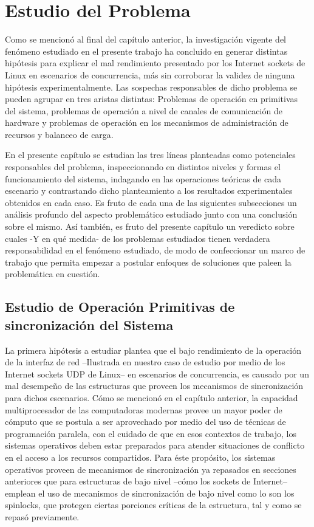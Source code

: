 \chapter{Estudio del Problema}

Como se mencionó al final del capítulo anterior, la investigación vigente del fenómeno estudiado en el presente trabajo ha concluido en generar distintas hipótesis para explicar el mal rendimiento presentado por los Internet sockets de Linux en escenarios de concurrencia, más sin corroborar la validez de ninguna hipótesis experimentalmente. Las sospechas responsables de dicho problema se pueden agrupar en tres aristas distintas: Problemas de operación en primitivas del sistema, problemas de operación a nivel de canales de comunicación de hardware y problemas de operación en los mecanismos de administración de recursos y balanceo de carga.

En el presente capítulo se estudian las tres líneas planteadas como potenciales responsables del problema, inspeccionando en distintos niveles y formas el funcionamiento del sistema, indagando en las operaciones teóricas de cada escenario y contrastando dicho planteamiento a los resultados experimentales obtenidos en cada caso. Es fruto de cada una de las siguientes subsecciones un análisis profundo del aspecto problemático estudiado junto con una conclusión sobre el mismo. Así también, es fruto del presente capítulo un veredicto sobre cuales -Y en qué medida- de los problemas estudiados tienen verdadera responsabilidad en el fenómeno estudiado, de modo de confeccionar un marco de trabajo que permita empezar a postular enfoques de soluciones que paleen la problemática en cuestión.

\section{Estudio de Operación Primitivas de sincronización del Sistema}

La primera hipótesis a estudiar plantea que el bajo rendimiento de la operación de la interfaz de red --Ilustrada en nuestro caso de estudio por medio de los Internet sockets UDP de Linux-- en escenarios de concurrencia, es causado por un mal desempeño de las estructuras que proveen los mecanismos de sincronización para dichos escenarios. Cómo se mencionó en el capítulo anterior, la capacidad multiprocesador de las computadoras modernas provee un mayor poder de cómputo que se postula a ser aprovechado por medio del uso de técnicas de programación paralela, con el cuidado de que en esos contextos de trabajo, los sistemas operativos deben estar preparados para atender situaciones de conflicto en el acceso a los recursos compartidos. Para éste propósito, los sistemas operativos proveen de mecanismos de sincronización ya repasados en secciones anteriores que para estructuras de bajo nivel --cómo los sockets de Internet-- emplean el uso de mecanismos de sincronización de bajo nivel como lo son los spinlocks, que protegen ciertas porciones críticas de la estructura, tal y como se repasó previamente.

